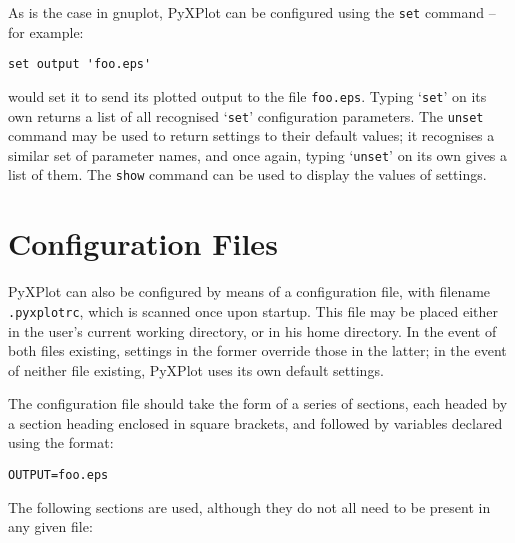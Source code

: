 \documentclass[a4paper,onecolumn,11pt]{book}
\begin{document}
As is the case in gnuplot, PyXPlot can be configured using the \noindent
\texttt{set} command -- for example:

\begin{verbatim}set output 'foo.eps'\end{verbatim}

\noindent would set it to send its plotted output to the file
\texttt{foo.eps}.  Typing `\texttt{set}' on its own returns a list of all
recognised `\texttt{set}' configuration parameters. The \texttt{unset} command
may be used to return settings to their default values; it recognises a similar
set of parameter names, and once again, typing `\texttt{unset}' on its own
gives a list of them. The \texttt{show} command can be used to display the
values of settings.

\section{Configuration Files}
\label{config_files}

PyXPlot can also be configured by means of a configuration file, with filename
\texttt{.pyxplotrc}, which is scanned once upon startup. This file may be
placed either in the user's current working directory, or in his home
directory. In the event of both files existing, settings in the former override
those in the latter; in the event of neither file existing, PyXPlot uses its
own default settings.

The configuration file should take the form of a series of sections, each
headed by a section heading enclosed in square brackets, and followed by
variables declared using the format:

\begin{verbatim} 
OUTPUT=foo.eps
\end{verbatim}

The following sections are used, although they do not all need to be present in
any given file:
\end{document}
